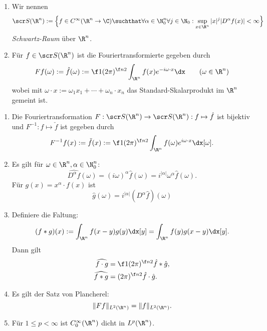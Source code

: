 \begin{df} \label{4.29}
	\begin{enumerate}[1)]
		\item
			Wir nennen
			\[
				\scr S(\R^n) := \Big\{ f \in C^\infty(\R^n \to \C) \suchthat \forall \alpha \in \N_0^n \forall j\in \N_0 : \sup_{x\in \R^n} |x|^j |D^{\alpha} f(x)| < \infty \Big\}
			\]
			\emph{Schwartz-Raum} über $\R^n$.
		\item
			Für $f \in \scr S(\R^n)$ ist die Fouriertransformierte gegeben durch
			\[
				F f(\omega) := \hat f(\omega) := \f 1{(2\pi)^{\f n2}} \int_{\R^n} f(x) e^{-i \omega \cdot x} \dx
				\qquad (\omega \in \R^n)
			\]
			wobei mit $\omega \cdot x := \omega_1 x_1 + \dotsb + \omega_n \cdot x_n$ das Standard-Skalarprodukt im $\R^n$ gemeint ist.
	\end{enumerate}
\end{df}

\begin{st} \label{4.30}
	\begin{enumerate}[1)]
		\item
			Die Fouriertransformation $F: \scr S(\R^n) \to \scr S(\R^n) : f \mapsto \hat f$ ist bijektiv und $F^{-1} : f \mapsto \check f$ ist gegeben durch
			\[
				F^{-1}f(x) := \check f (x) := \f 1{(2\pi)^{\f n2}} \int_{\R^n} f(\omega) e^{i \omega \cdot x} \dx[\omega].
			\]
		\item
			Es gilt für $\omega \in \R^n, \alpha \in \N_0^n$:
			\[
				\widehat{D^\alpha f}(\omega) = (i\omega)^\alpha \hat f(\omega) = i^{|\alpha|} \omega^\alpha \hat f(\omega).
			\]
			Für $g(x) = x^\alpha \cdot f(x)$ ist
			\[
				\hat g(\omega) = i^{|\alpha|} (D^\alpha \hat f) (\omega)
			\]
		\item
			Definiere die Faltung:
			\[
				(f \ast g)(x) := \int_{\R^n} f(x-y) g(y) \dx[y] = \int_{\R^n} f(y) g(x-y) \dx[y].
			\]
			Dann gilt
			\begin{align*}
				\widehat{f\cdot g} &=  \f 1{(2\pi)^{\f n2 }} \hat f \ast \hat g, \\
				\widehat{f\ast g} &= (2\pi)^{\f n2} \hat f \cdot \hat g.
			\end{align*}
		\item
			Es gilt der Satz von Plancherel:
			\[
				\|F f\|_{L^2(\R^n)} = \|f\|_{L^2(\R^n)}.
			\]
		\item
			Für $1 \le p < \infty$ ist $C_0^\infty(\R^n)$ dicht in $L^p(\R^n)$.
	\end{enumerate}
\end{st}

